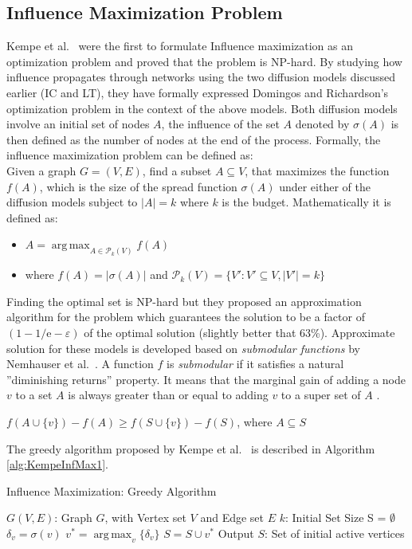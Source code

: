 \documentclass[english]{tktltiki}
\DeclareMathOperator*{\argmax}{arg\,max}
\begin{document}
\subsection{Influence Maximization Problem}
Kempe et al.\ \cite{kempe03} were the first to formulate Influence maximization as an optimization problem and proved that the problem is NP-hard. 
By studying how influence propagates through networks using the two diffusion models discussed earlier (IC and LT), they have formally expressed Domingos and Richardson's \cite{domingo01} optimization problem in the context of the above models. 
Both diffusion models involve an initial set of nodes $A$, the influence of the set $A$ denoted by $\sigma (A)$ is then defined as the number of nodes at the end of the process. 
Formally, the influence maximization problem can be defined as: \\
Given a graph $G=(V,E)$, find a subset $A\subseteq V$, that maximizes the function $f(A)$, which is the size of the spread function $\sigma(A)$ under either of the diffusion models subject to $|A| = k$ where $k$ is the budget. 
Mathematically it is defined as:
\begin{center}
\begin{itemize}
\item $A =  \argmax_{A \in \mathcal P_k(V) } f(A)$
\item where $f(A) = |\sigma(A)|$ and $\mathcal P_k(V) = \{V':V' \subseteq V, |V'|=k\}$
\end{itemize}
\end{center}
Finding the optimal set is NP-hard but they proposed an approximation algorithm for the problem which guarantees the solution to be a factor of $(1 - 1/ \mathrm{e} - \varepsilon)$ of the optimal solution (slightly better that 63\%). 
Approximate solution for these models is developed based on \textit{submodular functions} by Nemhauser et al.\ \cite{nemhauser78}.
A function $f$ is \textit{submodular} if it satisfies a natural ''diminishing returns'' property. 
It means that the marginal gain of adding a node $v$ to a set $A$ is always greater than or equal to adding $v$ to a super set of $A$ . 
\begin{center}
$f(A \cup \{v\}) - f(A) \geq f(S \cup \{v\}) - f(S)$, where $A \subseteq S$
\end{center}
The greedy algorithm proposed by Kempe et al.\ \cite{kempe03} is described in Algorithm \ref{alg:KempeInfMax1}. 
\begin{algorithm}[ht!]
\caption{Influence Maximization: Greedy Algorithm \cite{kempe03}}
\label{alg:KempeInfMax1}
\begin{algorithmic}
\Require $G(V,E)$: Graph $G$, with Vertex set $V$ and Edge set $E$
\Require $k$: Initial Set Size
\State S = $\emptyset$
		\State $\delta_v = \sigma(v)$
	\EndFor
	\State $v^* = \argmax_v \{\delta_v\}$
	\State $S = S \cup v^*$
\EndFor
\State Output $S$: Set of initial active vertices
\end{algorithmic}
\end{algorithm}
\end{document}
